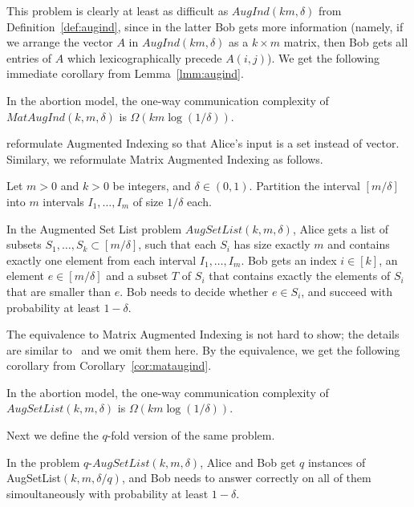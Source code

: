 This problem is clearly at least as difficult as $AugInd(km,\delta)$ from Definition~\ref{def:augind}, since in the latter Bob gets more information (namely, if we arrange the vector $A$ in $AugInd(km,\delta)$ as a $k\times m$ matrix, then 
Bob gets all entries of $A$ which lexicographically precede $A(i,j)$).
We get the following immediate corollary from Lemma~\ref{lmm:augind}.

\begin{corollary}\label{cor:mataugind}
In the abortion model,
the one-way communication complexity of $MatAugInd(k,m,\delta)$ is $\Omega(km\log(1/\delta))$.
\end{corollary}

\cite{molinaro2013beating} reformulate Augmented Indexing so that Alice's input is a set instead of vector.
Similary, we reformulate Matrix Augmented Indexing as follows.

\begin{definition}
Let $m>0$ and $k>0$ be integers, and $\delta\in(0,1)$.
Partition the interval $[m/\delta]$ into $m$ intervals $I_1,\ldots,I_m$ of size $1/\delta$ each.

In the Augmented Set List problem $AugSetList(k,m,\delta)$, Alice gets a list of subsets $S_1,\ldots,S_k\subset [m/\delta]$, such that each $S_i$ has size exactly $m$ and contains exactly one element from each interval $I_1,\ldots,I_m$.
Bob gets an index $i\in[k]$, an element $e\in[m/\delta]$ and a subset $T$ of $S_i$ that contains exactly the elements of $S_i$ that are smaller than $e$.
Bob needs to decide whether $e\in S_i$, and succeed with probability at least $1-\delta$.
\end{definition}

The equivalence to Matrix Augmented Indexing is not hard to show; the details are similar to~\cite{molinaro2013beating} and we omit them here. By the equivalence, we get the following corollary from Corollary~\ref{cor:mataugind}.
\begin{corollary}\label{cor:setlist}
In the abortion model,
the one-way communication complexity of $AugSetList(k,m,\delta)$ is $\Omega(km\log(1/\delta))$.
\end{corollary}

Next we define the $q$-fold version of the same problem.
\begin{definition}\label{def:qaugsetlist}
In the problem $q$-$AugSetList(k,m,\delta)$, Alice and Bob get $q$ instances of AugSetList$(k,m,\delta/q)$, and Bob needs to answer correctly on all of them simoultaneously with probability at least $1-\delta$.
\end{definition}

